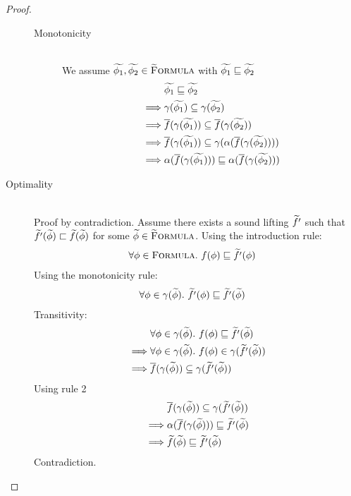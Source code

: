 \begin{proof}
\begin{description}
\begin{description}
            \item[Monotonicity]~\\ 
            We assume $\widetilde{\phi_1}, \widetilde{\phi_2} \in \textup{\textsc{\ensuremath{\widetilde{\text{F}}}ormula}}$ with $\widetilde{\phi_1} \sqsubseteq \widetilde{\phi_2}$
            \begin{align*}
            &\grad{\phi_1} \mpt \grad{\phi_2}\\
            \implies
            &\gamma(\grad{\phi_1}) \subseteq \gamma(\grad{\phi_2})\\
            \implies
            &\overline{f}(\gamma(\grad{\phi_1})) \subseteq \overline{f}(\gamma(\grad{\phi_2}))\\
            \implies %
            &\overline{f}(\gamma(\grad{\phi_1})) \subseteq \gamma(\alpha(\overline{f}(\gamma(\grad{\phi_2}))))\\
            \implies %
            &\alpha(\overline{f}(\gamma(\grad{\phi_1}))) \mpt \alpha(\overline{f}(\gamma(\grad{\phi_2})))\\
            \end{align*}
        \end{description}
        
        \item[Optimality]~\\
        
        Proof by contradiction.
        Assume there exists a sound lifting $\widetilde{f'}$ such that $\widetilde{f'}(\widetilde{\phi}) \sqsubset \widetilde{f}(\widetilde{\phi})$ for some $\widetilde{\phi} \in \textup{\textsc{\ensuremath{\widetilde{\text{F}}}ormula}}$.
        Using the introduction rule:
        \begin{align*}
        &\forall \phi \in \textup{\textsc{Formula}}.~ f(\phi) \sqsubseteq \widetilde{f'}(\phi)
        \end{align*}
        Using the monotonicity rule:
        \begin{align*}
        &\forall \phi \in \gamma(\widetilde{\phi}).~ \widetilde{f'}(\phi) \sqsubseteq \widetilde{f'}(\widetilde{\phi})
        \end{align*}
        Transitivity:
        \begin{align*}
        &\forall \phi \in \gamma(\widetilde{\phi}).~ f(\phi) \sqsubseteq \widetilde{f'}(\widetilde{\phi})\\
        \implies
        &\forall \phi \in \gamma(\widetilde{\phi}).~ f(\phi) \in \gamma(\widetilde{f'}(\widetilde{\phi}))\\
        \implies
        &\overline{f}(\gamma(\widetilde{\phi})) \subseteq \gamma(\widetilde{f'}(\widetilde{\phi}))\\
        \end{align*}
        Using rule 2
        \begin{align*}
        &\overline{f}(\gamma(\widetilde{\phi})) \subseteq \gamma(\widetilde{f'}(\widetilde{\phi}))\\
        \implies
        &\alpha(\overline{f}(\gamma(\widetilde{\phi}))) \sqsubseteq \widetilde{f'}(\widetilde{\phi})\\
        \implies
        &\widetilde{f}(\widetilde{\phi}) \sqsubseteq \widetilde{f'}(\widetilde{\phi})\\
        \end{align*}
        Contradiction.
    \end{description}       
\end{proof}


